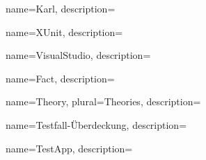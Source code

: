 {
	name=Karl,
	description={}
}

{
	name=XUnit,
	description={}
}

{
	name=VisualStudio,
	description={}
}

{
	name=Fact,
	description={}
}

{
	name=Theory,
	plural=Theories,
	description={}
}

{
	name=Testfall-Überdeckung,
	description={}
}

{
	name=TestApp,
	description={}
}
